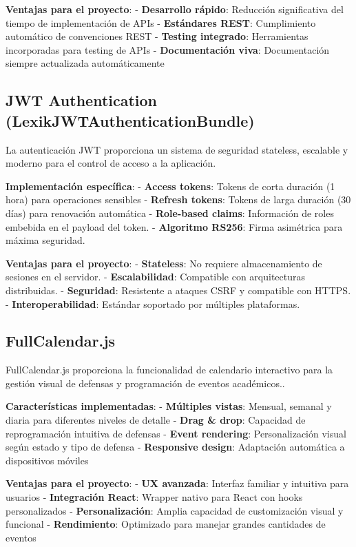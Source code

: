 \documentclass[12pt,a4paper,oneside]{report}
\begin{document}
\textbf{Ventajas para el proyecto}: - \textbf{Desarrollo rápido}:
Reducción significativa del tiempo de implementación de APIs -
\textbf{Estándares REST}: Cumplimiento automático de convenciones REST -
\textbf{Testing integrado}: Herramientas incorporadas para testing de
APIs - \textbf{Documentación viva}: Documentación siempre actualizada
automáticamente

\subsection{JWT Authentication
(LexikJWTAuthenticationBundle)}\label{jwt-authentication-lexikjwtauthenticationbundle}

La autenticación JWT proporciona un sistema de seguridad stateless,
escalable y moderno para el control de acceso a la aplicación.

\textbf{Implementación específica}: - \textbf{Access tokens}: Tokens de
corta duración (1 hora) para operaciones sensibles - \textbf{Refresh
tokens}: Tokens de larga duración (30 días) para renovación automática -
\textbf{Role-based claims}: Información de roles embebida en el payload
del token. - \textbf{Algoritmo RS256}: Firma asimétrica para máxima
seguridad.

\textbf{Ventajas para el proyecto}: - \textbf{Stateless}: No requiere
almacenamiento de sesiones en el servidor. - \textbf{Escalabilidad}:
Compatible con arquitecturas distribuidas. - \textbf{Seguridad}:
Resistente a ataques CSRF y compatible con HTTPS. -
\textbf{Interoperabilidad}: Estándar soportado por múltiples
plataformas.

\subsection{FullCalendar.js}\label{fullcalendar.js}

FullCalendar.js proporciona la funcionalidad de calendario interactivo
para la gestión visual de defensas y programación de eventos
académicos..

\textbf{Características implementadas}: - \textbf{Múltiples vistas}:
Mensual, semanal y diaria para diferentes niveles de detalle -
\textbf{Drag \& drop}: Capacidad de reprogramación intuitiva de defensas
- \textbf{Event rendering}: Personalización visual según estado y tipo
de defensa - \textbf{Responsive design}: Adaptación automática a
dispositivos móviles

\textbf{Ventajas para el proyecto}: - \textbf{UX avanzada}: Interfaz
familiar y intuitiva para usuarios - \textbf{Integración React}: Wrapper
nativo para React con hooks personalizados - \textbf{Personalización}:
Amplia capacidad de customización visual y funcional -
\textbf{Rendimiento}: Optimizado para manejar grandes cantidades de
eventos
\end{document}
